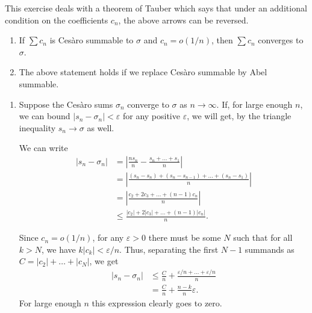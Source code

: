 \documentclass[12 pt, letterpaper]{hmcpset}
\begin{document}
\pagebreak

\begin{problem}[S \& S \S 2.6 \#14.]
	This exercise deals with a theorem of Tauber which says that under an additional condition on the coefficients $c_{n}$, the above arrows can be reversed.
	\begin{enumerate}
		\item If $\sum c_{n}$ is Ces\`aro summable to $\sigma$ and $c_{n} = o(1 / n)$, then $\sum c_{n}$ converges to $\sigma$.
		\item The above statement holds if we replace Ces\`aro summable by Abel summable.
	\end{enumerate}
\end{problem}

\begin{solution}
	\begin{enumerate}
		\item Suppose the Ces\`aro sums $\sigma_{n}$ converge to $\sigma$ as $n \to \infty$. If, for large enough $n$, we can bound $\lvert s_{n} - \sigma_{n} \rvert < \varepsilon$ for any positive $\varepsilon$, we will get, by the triangle inequality $s_{n} \to \sigma$ as well.

			We can write
			\begin{align*}
				\lvert s_{n} - \sigma_{n} \rvert & = \left \lvert \frac{n s_{n}}{n} - \frac{s_{n} + \dots + s_{1}}{n} \right \rvert \\
								 & = \left \lvert \frac{(s_{n} - s_{n}) + (s_{n} - s_{n - 1}) + \dots + (s_{n} - s_{1})}{n} \right \rvert \\
								 & = \left \lvert \frac{c_{2} + 2 c_{3} + \dots + (n - 1) c_{n}}{n} \right \rvert \\
								 & \le \frac{\lvert c_{2} \rvert + 2 \lvert c_{3} \rvert + \dots + (n - 1) \lvert c_{n} \rvert}{n}.
			\end{align*}

			Since $c_{n} = o(1 / n)$, for any $\varepsilon > 0$ there must be some $N$ such that for all $k > N$, we have $k \lvert c_{k} \rvert < \varepsilon / n$. Thus, separating the first $N - 1$ summands as $C = \lvert c_{2} \rvert + \dots + \lvert c_{N} \rvert$, we get
			\begin{align*}
				\lvert s_{n} - \sigma_{n} \rvert & \le \frac{C}{n} + \frac{\varepsilon / n + \dots + \varepsilon / n}{n} \\
								 & = \frac{C}{n} + \frac{n - k}{n} \varepsilon.
			\end{align*}
			For large enough $n$ this expression clearly goes to zero.


\end{enumerate}
\end{solution}
\end{document}
